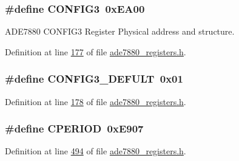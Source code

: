 \hypertarget{a00036_a8d128687074c874210b0c9dada3d8ca7}{
\subsubsection[{C\-O\-N\-F\-I\-G3}]{\setlength{\rightskip}{0pt plus 5cm}\#define C\-O\-N\-F\-I\-G3~0x\-E\-A00}}\label{de/d8c/a00036_a8d128687074c874210b0c9dada3d8ca7}


A\-D\-E7880 C\-O\-N\-F\-I\-G3 Register Physical address and structure. 



Definition at line \hyperlink{a00036_source_l00177}{177} of file \hyperlink{a00036_source}{ade7880\-\_\-registers.\-h}.

\hypertarget{a00036_a6d4592c2f28292b11885fa8ec3ed0941}{
\subsubsection[{C\-O\-N\-F\-I\-G3\-\_\-\-D\-E\-F\-U\-L\-T}]{\setlength{\rightskip}{0pt plus 5cm}\#define C\-O\-N\-F\-I\-G3\-\_\-\-D\-E\-F\-U\-L\-T~0x01}}\label{de/d8c/a00036_a6d4592c2f28292b11885fa8ec3ed0941}


Definition at line \hyperlink{a00036_source_l00178}{178} of file \hyperlink{a00036_source}{ade7880\-\_\-registers.\-h}.

\hypertarget{a00036_ad089734d1b0b03f6256cd3004b6127ce}{
\subsubsection[{C\-P\-E\-R\-I\-O\-D}]{\setlength{\rightskip}{0pt plus 5cm}\#define C\-P\-E\-R\-I\-O\-D~0x\-E907}}\label{de/d8c/a00036_ad089734d1b0b03f6256cd3004b6127ce}


Definition at line \hyperlink{a00036_source_l00494}{494} of file \hyperlink{a00036_source}{ade7880\-\_\-registers.\-h}.

